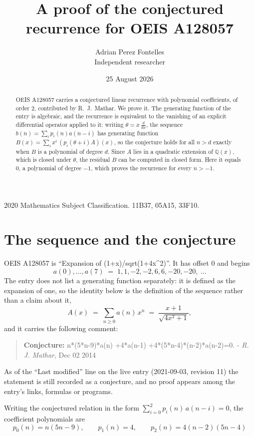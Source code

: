 \documentclass[11pt,a4paper]{article}
\title{A proof of the conjectured recurrence for OEIS A128057}
\author{Adrian Perez Fontelles\\ \small Independent researcher}
\date{25 August 2026}
\theoremstyle{plain}
\theoremstyle{definition}
\begin{document}
\maketitle

\begin{abstract}
OEIS A128057 carries a conjectured linear recurrence with polynomial coefficients, of
order 2, contributed by R.~J.~Mathar. We prove it. The generating function of the
entry is algebraic, and the recurrence is equivalent to the vanishing of an explicit
differential operator applied to it: writing $\theta=x\,\frac{d}{dx}$, the sequence
$b(n)=\sum_{i}p_{i}(n)a(n-i)$ has generating function
$B(x)=\sum_{i}x^{i}\,(p_{i}(\theta+i)A)(x)$, so the conjecture holds for all $n>d$ exactly
when $B$ is a polynomial of degree $d$. Since $A$ lies in a quadratic extension of
$\mathbb{Q}(x)$, which is closed under $\theta$, the residual $B$ can be computed in
closed form. Here it equals $0$, a polynomial of degree $-1$, which proves
the recurrence for every $n>-1$.
\end{abstract}

\noindent\small 2020 Mathematics Subject Classification. 11B37, 05A15, 33F10.\normalsize

\section{The sequence and the conjecture}

OEIS A128057 is ``Expansion of (1+x)/sqrt(1+4x\^{}2)''. It has offset $0$ and begins
\[
a(0),\dots,a(7)\;=\;1, 1, -2, -2, 6, 6, -20, -20,\ \dots
\]
The entry does not list a generating function separately: it is defined as the
expansion of one, so the identity below is the definition of the sequence rather than a
claim about it,
\begin{equation}\label{eq:gf}
A(x)\;=\;\sum_{n\ge 0} a(n)\,x^{n}\;=\;\frac{x + 1}{\sqrt{4 x^{2} + 1}} ,
\end{equation}
and it carries the following comment:
\begin{quote}\small
\textbf{Conjecture:} n*(5*n-9)*a(n) +4*a(n-1) +4*(5*n-4)*(n-2)*a(n-2)=0. - \emph{R. J. Mathar}, Dec 02 2014
\end{quote}
As of the ``Last modified'' line on the live entry (2021-09-03, revision 11) the
statement is still recorded as a conjecture, and no proof appears among the entry's links,
formulas or programs.

Writing the conjectured relation in the form $\sum_{i=0}^{2}p_{i}(n)\,a(n-i)=0$,
the coefficient polynomials are
\[
p_{0}(n)=n \left(5 n - 9\right),\qquad p_{1}(n)=4,\qquad p_{2}(n)=4 \left(n - 2\right) \left(5 n - 4\right)
\]
\end{document}
